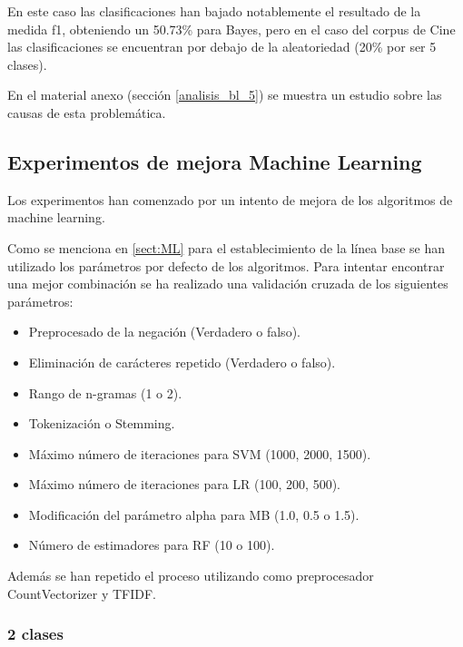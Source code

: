 En este caso las clasificaciones han bajado notablemente el resultado de la medida f1, obteniendo un 50.73\% para Bayes, pero en el caso del corpus de Cine las clasificaciones se encuentran por debajo de la aleatoriedad (20\% por ser 5 clases).

En el material anexo (sección \ref{analisis_bl_5}) se muestra un estudio sobre las causas de esta problemática.

\subsection{Experimentos de mejora Machine Learning}

Los experimentos han comenzado por un intento de mejora de los algoritmos de machine learning.

Como se menciona en \ref{sect:ML} para el establecimiento de la línea base se han utilizado los parámetros por defecto de los algoritmos. Para intentar encontrar una mejor combinación se ha realizado una validación cruzada de los siguientes parámetros:

\begin{itemize}
	\item Preprocesado de la negación (Verdadero o falso).
	\item Eliminación de carácteres repetido (Verdadero o falso).
	\item Rango de n-gramas (1 o 2).
	\item Tokenización o Stemming.
	\item Máximo número de iteraciones para SVM (1000, 2000, 1500).
	\item Máximo número de iteraciones para LR (100, 200, 500).
	\item Modificación del parámetro alpha para MB (1.0, 0.5 o 1.5).
	\item Número de estimadores para RF (10 o 100).
\end{itemize}

Además se han repetido el proceso utilizando como preprocesador CountVectorizer y TFIDF.



\subsubsection{2 clases}

